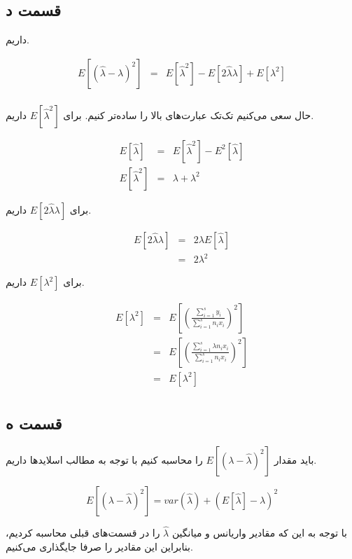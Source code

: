 \documentclass{article}
\begin{document}
\subsection*{قسمت د}

داریم.

\begin{eqnarray*}
    E[(\hat{\lambda} - \lambda)^2] & = & E[\hat{\lambda}^2] - E[2\hat{\lambda}\lambda] + E[\lambda^2]\\
\end{eqnarray*}

حال سعی می‌کنیم تک‌تک عبارت‌های بالا را ساده‌تر کنیم.
\newline
برای $E[\hat{\lambda}^2]$ داریم.

\begin{eqnarray*}
    E[\hat{\lambda}] & = & E[\hat{\lambda}^2] - E^2[\hat{\lambda}] \\
    E[\hat{\lambda}^2] & = & \lambda + \lambda^2
\end{eqnarray*}

برای $E[2\hat{\lambda}\lambda]$ داریم.

\begin{eqnarray*}
    E[2\hat{\lambda}\lambda]  & = & 2\lambda E[\hat{\lambda}] \\
    & = & 2\lambda^2
\end{eqnarray*}

برای $E[\lambda^2]$ داریم.

\begin{eqnarray*}
    E[\lambda^2]  & = & E[(\frac{\sum_{i=1}^{s} y_i}{\sum_{i=1}^{s} n_ix_i})^2] \\
    & = & E[(\frac{\sum_{i=1}^{s} \lambda n_ix_i}{\sum_{i=1}^{s} n_ix_i})^2] \\
    & = & E[\lambda^2] \\
\end{eqnarray*}

\subsection*{قسمت ه}

باید مقدار $E[(\lambda -\hat{\lambda})^2]$ را محاسبه کنیم با توجه به مطالب اسلاید‌ها داریم.

$$E[(\lambda -\hat{\lambda})^2] = var(\hat{\lambda}) + (E[\hat{\lambda}] - \lambda)^2$$

با توجه به این که مقادیر واریانس و میانگین $\hat{\lambda}$ را در قسمت‌های قبلی محاسبه کردیم، بنابراین
این مقادیر را صرفا جایگذاری می‌کنیم.
\end{document}
